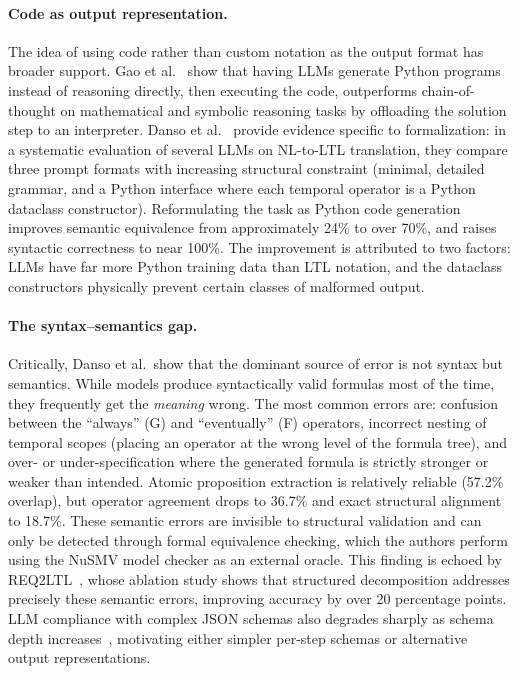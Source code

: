 \paragraph{Code as output representation.}
The idea of using code rather than custom notation as the output format
has broader support. Gao et al.~\cite{gao2022pal} show that having LLMs
generate Python programs instead of reasoning directly, then executing
the code, outperforms chain-of-thought on mathematical and symbolic
reasoning tasks by offloading the solution step to an interpreter.
Danso et al.~\cite{danso2026syntax} provide evidence specific to
formalization: in a systematic evaluation of several LLMs on NL-to-LTL
translation, they compare three prompt formats with increasing structural
constraint (minimal, detailed grammar, and a Python interface where each
temporal operator is a Python dataclass constructor). Reformulating the
task as Python code generation improves semantic equivalence from
approximately 24\% to over 70\%, and raises syntactic correctness to
near 100\%. The improvement is attributed to two factors: LLMs have far
more Python training data than LTL notation, and the dataclass
constructors physically prevent certain classes of malformed output.

\paragraph{The syntax--semantics gap.}
Critically, Danso et al.\ show that the dominant source of error is not
syntax but semantics. While models produce syntactically valid formulas
most of the time, they frequently get the \textit{meaning} wrong. The
most common errors are: confusion between the ``always'' (G) and
``eventually'' (F) operators, incorrect nesting of temporal scopes
(placing an operator at the wrong level of the formula tree), and over-
or under-specification where the generated formula is strictly stronger
or weaker than intended. Atomic proposition extraction is relatively
reliable (57.2\% overlap), but operator agreement drops to 36.7\% and
exact structural alignment to 18.7\%. These semantic errors are invisible
to structural validation and can only be detected through formal
equivalence checking, which the authors perform using the NuSMV model
checker as an external oracle. This finding is echoed by
REQ2LTL~\cite{ma2025req2ltl}, whose ablation study shows that structured
decomposition addresses precisely these semantic errors, improving
accuracy by over 20 percentage points. LLM compliance with complex JSON
schemas also degrades sharply as schema depth
increases~\cite{geng2025jsonschemabench}, motivating either simpler
per-step schemas or alternative output representations.

